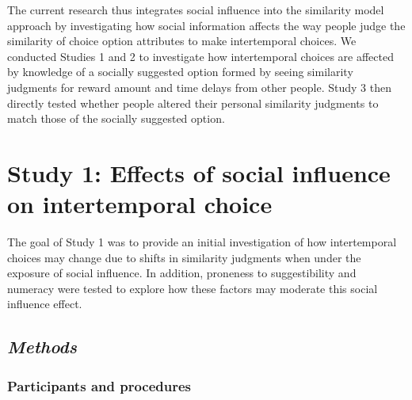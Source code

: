 \documentclass[
  pub,floatsintext]{apa6}
\begin{document}
The current research thus integrates social influence into the similarity model approach by investigating how social information affects the way people judge the similarity of choice option attributes to make intertemporal choices. We conducted Studies 1 and 2 to investigate how intertemporal choices are affected by knowledge of a socially suggested option formed by seeing similarity judgments for reward amount and time delays from other people. Study 3 then directly tested whether people altered their personal similarity judgments to match those of the socially suggested option.

\hypertarget{study-1-effects-of-social-influence-on-intertemporal-choice}{%
\section{Study 1: Effects of social influence on intertemporal choice}\label{study-1-effects-of-social-influence-on-intertemporal-choice}}

The goal of Study 1 was to provide an initial investigation of how intertemporal choices may change due to shifts in similarity judgments when under the exposure of social influence. In addition, proneness to suggestibility and numeracy were tested to explore how these factors may moderate this social influence effect.

\hypertarget{methods}{%
\subsection{\texorpdfstring{\emph{Methods}}{Methods}}\label{methods}}

\hypertarget{participants-and-procedures}{%
\subsubsection{Participants and procedures}\label{participants-and-procedures}}
\end{document}
